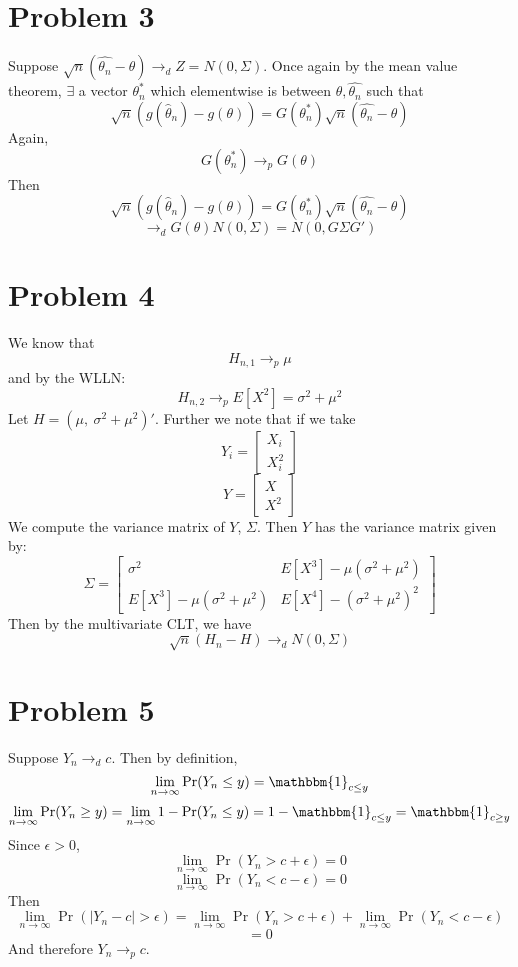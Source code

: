 \documentclass[10pt,letter]{article}
\begin{document}
\section*{Problem 3}
Suppose $\sqrt{n}(\hat{\theta_n} - \theta) \to_d Z = N(0, \Sigma)$. Once again by the mean value theorem, $\exists$ a vector $\theta^*_n$ which elementwise is between $\theta, \hat{\theta_n}$ such that
\[ \sqrt{n} \left( g(\hat{\theta}_{n}) - g(\theta)\right) = G(\theta^*_n)\sqrt{n}(\hat{\theta_n} - \theta) \]
Again,
\[G(\theta^*_n) \to_p  G(\theta) \]
Then
\[ \sqrt{n} \left( g(\hat{\theta}_{n}) - g(\theta)\right) = G(\theta^*_n)\sqrt{n}(\hat{\theta_n} - \theta) \]
\[ \to_d G(\theta) N(0,\Sigma) = N(0, G\Sigma G') \]

\section*{Problem 4}
We know that
\[ H_{n,1} \to_p \mu \]
and by the WLLN:
\[ H_{n,2} \to_p E[X^2] = \sigma^2 + \mu^2 \]
Let $H = (\mu, \ \sigma^2 + \mu^2)'$. Further we note that if we take
\[ Y_i = \begin{bmatrix}
X_i \\
X_i^2
\end{bmatrix} \]
\[ Y = \begin{bmatrix}
X \\
X^2
\end{bmatrix} \]
We compute the variance matrix of $Y$, $\Sigma$. Then $Y$ has the variance matrix given by:
\[ \Sigma = \begin{bmatrix}
\sigma^2 & E[X^3] - \mu(\sigma^2 + \mu^2) \\
E[X^3] - \mu(\sigma^2 + \mu^2) & E[X^4] - (\sigma^2 + \mu^2)^2
\end{bmatrix} \]
Then by the multivariate CLT, we have
\[ \sqrt{n}(H_n - H) \to_d N(0, \Sigma) \]
\section*{Problem 5}
Suppose $Y_n \to_d c$. Then by definition,
\[ \lim_{n \to \infty} \Pr(Y_n \le y) = \mathbbm{1}_{c \le y} \]
\[ \lim_{n \to \infty} \Pr(Y_n \ge y) = \lim_{n \to \infty} 1 - \Pr(Y_n \le y)  = 1 - \mathbbm{1}_{c \le y} = \mathbbm{1}_{c \ge y} \]
Since $ \epsilon > 0$,
\[\lim_{n \to \infty} \Pr(Y_n  > c + \epsilon) = 0 \]
\[\lim_{n \to \infty} \Pr(Y_n  < c - \epsilon) = 0 \]
Then
\[ \lim_{n \to \infty} \Pr(|Y_n - c| > \epsilon) = \lim_{n \to \infty} \Pr(Y_n  > c + \epsilon) + \lim_{n \to \infty} \Pr(Y_n  < c - \epsilon) \]
\[ = 0 \]
And therefore $Y_n \to_p c$.
\end{document}
